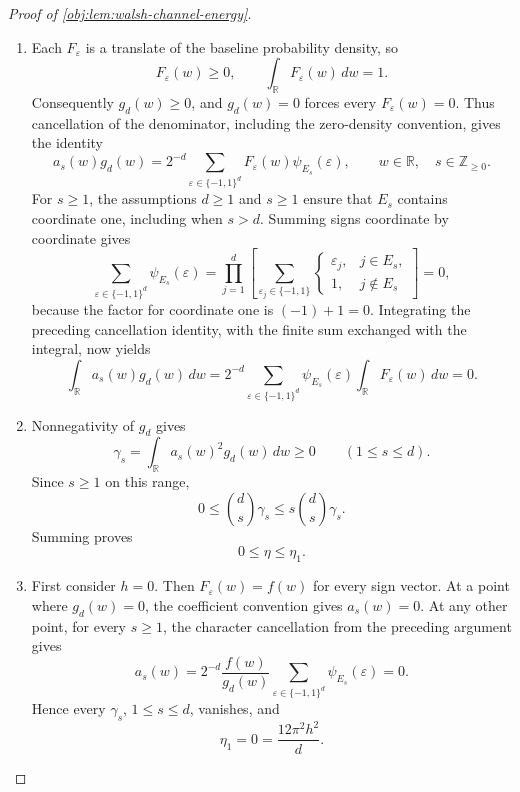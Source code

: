 \documentclass[11pt]{article}
\begin{document}
\begin{proof}[Proof of \cref{obj:lem:walsh-channel-energy}]
\begin{enumerate}
\item Each \(F_\varepsilon\) is a translate of the baseline probability density, so
\[
F_\varepsilon(w)\ge0,
\qquad
\int_{\mathbb R}F_\varepsilon(w)\,dw=1.
\]
Consequently \(g_d(w)\ge0\), and \(g_d(w)=0\) forces every \(F_\varepsilon(w)=0\). Thus cancellation of the denominator, including the zero-density convention, gives the identity
\[
a_s(w)g_d(w)
=
2^{-d}\sum_{\varepsilon\in\{-1,1\}^d}
F_\varepsilon(w)\psi_{E_s}(\varepsilon),
\qquad w\in\mathbb R,\quad s\in\mathbb Z_{\ge0}.
\]
For \(s\ge1\), the assumptions \(d\ge1\) and \(s\ge1\) ensure that \(E_s\) contains coordinate one, including when \(s>d\). Summing signs coordinate by coordinate gives
\[
\sum_{\varepsilon\in\{-1,1\}^d}\psi_{E_s}(\varepsilon)
=
\prod_{j=1}^d
\left[
\sum_{\varepsilon_j\in\{-1,1\}}
\begin{cases}
\varepsilon_j,&j\in E_s,\\
1,&j\notin E_s
\end{cases}
\right]
=0,
\]
because the factor for coordinate one is \((-1)+1=0\). Integrating the preceding cancellation identity, with the finite sum exchanged with the integral, now yields
\[
\int_{\mathbb R}a_s(w)g_d(w)\,dw
=
2^{-d}\sum_{\varepsilon\in\{-1,1\}^d}
\psi_{E_s}(\varepsilon)
\int_{\mathbb R}F_\varepsilon(w)\,dw
=0.
\]

\item Nonnegativity of \(g_d\) gives
\[
\gamma_s=\int_{\mathbb R}a_s(w)^2g_d(w)\,dw\ge0
\qquad(1\le s\le d).
\]
Since \(s\ge1\) on this range,
\[
0\le \binom ds\gamma_s
\le s\binom ds\gamma_s.
\]
Summing proves
\[
0\le\eta\le\eta_1.
\]

\item First consider \(h=0\). Then \(F_\varepsilon(w)=f(w)\) for every sign vector. At a point where \(g_d(w)=0\), the coefficient convention gives \(a_s(w)=0\). At any other point, for every \(s\ge1\), the character cancellation from the preceding argument gives
\[
a_s(w)
=
2^{-d}\frac{f(w)}{g_d(w)}
\sum_{\varepsilon\in\{-1,1\}^d}\psi_{E_s}(\varepsilon)
=0.
\]
Hence every \(\gamma_s\), \(1\le s\le d\), vanishes, and
\[
\eta_1=0=\frac{12\pi^2h^2}{d}.
\]


\end{enumerate}
\end{proof}
\end{document}
